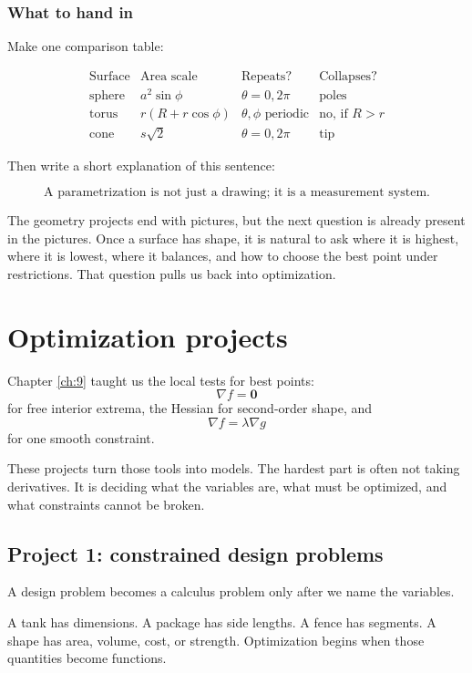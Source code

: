 \subsubsection*{What to hand in}

Make one comparison table:

\[
\begin{array}{c|c|c|c}
\text{Surface} & \text{Area scale} & \text{Repeats?} & \text{Collapses?} \\ \hline
\text{sphere} & a^2\sin\phi & \theta=0,2\pi & \text{poles}\\[1mm]
\text{torus} & r(R+r\cos\phi) & \theta,\phi \text{ periodic} & \text{no, if }R>r\\[1mm]
\text{cone} & s\sqrt2 & \theta=0,2\pi & \text{tip}
\end{array}
\]

Then write a short explanation of this sentence:

\[
\boxed{
    \text{A parametrization is not just a drawing; it is a measurement system.}
}
\]

The geometry projects end with pictures, but the next question is already present in
the pictures.  Once a surface has shape, it is natural to ask where it is highest, where
it is lowest, where it balances, and how to choose the best point under restrictions.
That question pulls us back into optimization.

\section{Optimization projects}
\label{sec:20.2}

Chapter \ref{ch:9} taught us the local tests for best points:
\[
    \nabla f=\mathbf 0
\]
for free interior extrema, the Hessian for second-order shape, and
\[
    \nabla f=\lambda\nabla g
\]
for one smooth constraint.

These projects turn those tools into models.  The hardest part is often not taking
derivatives.  It is deciding what the variables are, what must be optimized, and what
constraints cannot be broken.

\subsection{Project 1: constrained design problems}

A design problem becomes a calculus problem only after we name the variables.

A tank has dimensions.  A package has side lengths.  A fence has segments.  A shape
has area, volume, cost, or strength.  Optimization begins when those quantities become
functions.

